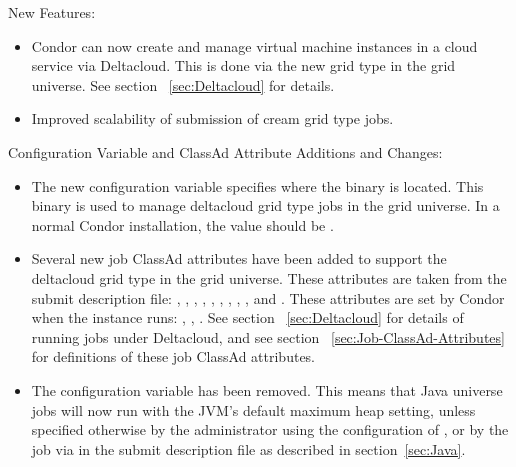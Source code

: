 \noindent New Features:

\begin{itemize}

\item Condor can now create and manage virtual machine instances in a
cloud service via Deltacloud. This is done via the new
 grid type in the grid universe.
See section ~\ref{sec:Deltacloud} for details.

\item Improved scalability of submission of cream grid type jobs.

\end{itemize}

\noindent Configuration Variable and ClassAd Attribute Additions and Changes:

\begin{itemize}

\item The new configuration variable  specifies
where the  binary is located. This binary is used to
manage deltacloud grid type jobs in the grid universe.
In a normal Condor installation, the value should be
.

\item Several new job ClassAd attributes have been added to support
the deltacloud grid type in the grid universe.
These attributes are taken from the submit description file:
,
,
,
,
,
,
,
,
, and
.
These attributes are set by Condor when the instance runs:
,
,
.
See section ~\ref{sec:Deltacloud} for details of running jobs under
Deltacloud, and see section ~\ref{sec:Job-ClassAd-Attributes}
for definitions of these job ClassAd attributes.

\item The configuration variable  
  has been removed. 
  This means that Java universe jobs will now run with the JVM's 
  default maximum heap setting,
  unless specified otherwise by the administrator using the configuration
  of ,
  or by the job via 
   in the submit description file
  as described in section~\ref{sec:Java}.


\end{itemize}
